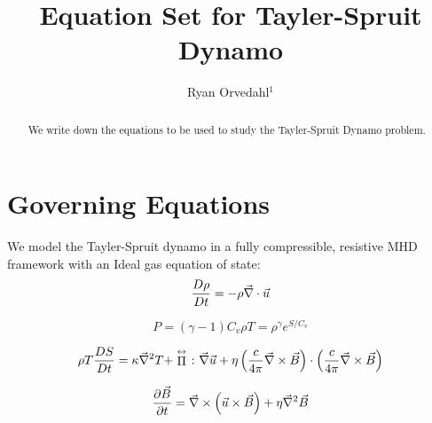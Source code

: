 \documentclass[apj,onecolumn]{emulateapj}
\newcommand{\uvec}{\ensuremath{\vec{u}}} %
\newcommand{\Bvec}{\ensuremath{\vec{B}}} %
\begin{document}
\title{Equation Set for Tayler-Spruit Dynamo}
\author{Ryan Orvedahl$^1$}

\begin{abstract}
We write down the equations to be used to study the Tayler-Spruit Dynamo 
problem.
\end{abstract}


\maketitle

\section{Governing Equations}
\label{sec:eqns}
We model the Tayler-Spruit dynamo in a fully compressible, resistive MHD 
framework with an Ideal gas equation of state:
\begin{equation}
\DxDt{\rho} = - \rho\del\cdot\uvec
\end{equation}

\begin{equation}
P=(\gamma - 1)C_v \rho T = \rho^\gamma e^{S/C_v}
\end{equation}

\begin{equation}
\rho T \DxDt{S} = \kappa\del^2 T +
 \stackrel{\leftrightarrow}{\Pi} \mathbf{\colon} \del \uvec
 + \eta \left(\frac{c}{4\pi}\del\times\Bvec\right)\cdot
 \left(\frac{c}{4\pi}\del\times\Bvec\right)
\end{equation}

\begin{equation}
\dxdt{\Bvec} = \del \times \left(\uvec\times\Bvec\right) + \eta\del^2\Bvec
\end{equation}
\end{document}
